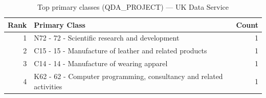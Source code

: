 \begin{table}[H]
    \centering
    \begin{tabular}{r p{10cm} r}
    \hline
    \textbf{Rank} & \textbf{Primary Class} & \textbf{Count} \\
    \hline
    1 & N72 - 72 - Scientific research and development & 1 \\
    2 & C15 - 15 - Manufacture of leather and related products & 1 \\
    3 & C14 - 14 - Manufacture of wearing apparel & 1 \\
    4 & K62 - 62 - Computer programming, consultancy and related activities & 1 \\
    \hline
    \end{tabular}
    \caption{Top primary classes (QDA\_PROJECT) --- UK Data Service}
\end{table}

